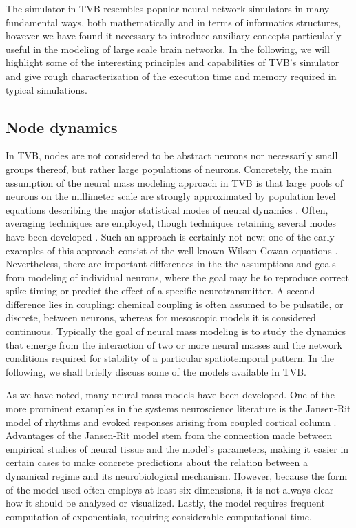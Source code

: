 The simulator in TVB resembles popular neural network simulators in 
many fundamental ways, both mathematically and in terms of informatics 
structures, however we have found it necessary to introduce auxiliary
concepts particularly useful in the modeling of large scale brain 
networks. In the following, we will highlight some of the interesting
principles and capabilities of TVB's simulator and give rough characterization
of the execution time and memory required in typical simulations.

\subsection{Node dynamics}

	In TVB, nodes are not considered to be abstract neurons nor necessarily
	small groups thereof, but rather large populations of neurons. Concretely,
	the main assumption of the neural mass modeling approach in TVB is that
	large pools of neurons on the millimeter scale are strongly approximated
	by population level equations describing the major statistical modes of
	neural dynamics \citep{Freeman_1975book}. Often, averaging techniques are
	employed, though techniques retaining several modes have been developed
	\citep{Stefanescu_2008, Stefanescu_2011}. Such an approach is certainly not
	new; one of the early examples of this approach consist of the well known
	Wilson-Cowan equations \citep{Wilson_1973}. Nevertheless, there are
	important differences in the the assumptions and goals from modeling of
	individual neurons, where the goal may be to reproduce correct spike
	timing or predict the effect of  a specific neurotransmitter. A second
	difference lies in coupling: chemical coupling is often assumed to be
	pulsatile, or discrete, between neurons, whereas for mesoscopic models it is considered
	continuous. Typically the goal of neural mass modeling is to study the
	dynamics that emerge from the interaction of two or more neural masses and
	the network conditions required for stability of a particular
	spatiotemporal pattern. In the following, we shall  briefly discuss some
	of the models available in TVB.

	As we have noted, many neural mass models have been developed. One of
	the more prominent examples in the systems neuroscience literature is 
	the Jansen-Rit model of rhythms and evoked responses arising from
	coupled cortical column \citep{Zetterberg_1978, Jansen_1995,David_2004, Spiegler_2010}. 
	Advantages of the Jansen-Rit model stem from the connection made
	between empirical studies of neural tissue and the model's parameters, 
	making it easier in certain cases to make concrete predictions about
	the relation between a dynamical regime and its neurobiological 
	mechanism. However, because the form of the model used often employs
	at least six dimensions, it is not always clear how it should be analyzed or
	visualized. Lastly, the model requires frequent computation of exponentials,
	requiring considerable computational time. 

